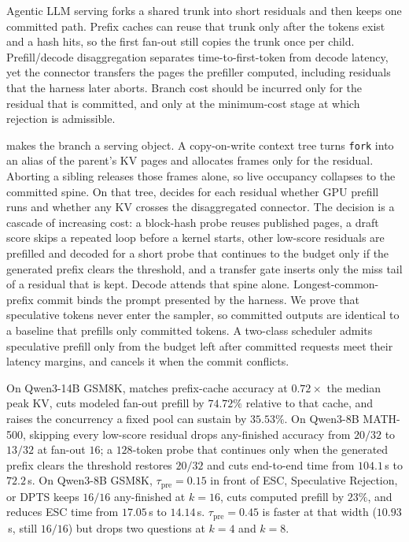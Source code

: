 Agentic LLM serving forks a shared trunk into short residuals and then keeps one committed path.
Prefix caches can reuse that trunk only after the tokens exist and a hash hits, so the first fan-out still copies the trunk once per child.
Prefill/decode disaggregation separates time-to-first-token from decode latency, yet the connector transfers the pages the prefiller computed, including residuals that the harness later aborts.
Branch cost should be incurred only for the residual that is committed, and only at the minimum-cost stage at which rejection is admissible.

\sys makes the branch a serving object.
A copy-on-write context tree turns \texttt{fork} into an alias of the parent's KV pages and allocates frames only for the residual.
Aborting a sibling releases those frames alone, so live occupancy collapses to the committed spine.
On that tree, \sys decides for each residual whether GPU prefill runs and whether any KV crosses the disaggregated connector.
The decision is a cascade of increasing cost: a block-hash probe reuses published pages, a draft score skips a repeated loop before a kernel starts, other low-score residuals are prefilled and decoded for a short probe that continues to the budget only if the generated prefix clears the threshold, and a transfer gate inserts only the miss tail of a residual that is kept.
Decode attends that spine alone.
Longest-common-prefix commit binds the prompt presented by the harness.
We prove that speculative tokens never enter the sampler, so committed outputs are identical to a baseline that prefills only committed tokens.
A two-class scheduler admits speculative prefill only from the budget left after committed requests meet their latency margins, and cancels it when the commit conflicts.

On Qwen3-14B GSM8K, \sys matches prefix-cache accuracy at $0.72\times$ the median peak KV, cuts modeled fan-out prefill by $74.72\%$ relative to that cache, and raises the concurrency a fixed pool can sustain by $35.53\%$.
On Qwen3-8B MATH-500, skipping every low-score residual drops any-finished accuracy from $20/32$ to $13/32$ at fan-out $16$; a $128$-token probe that continues only when the generated prefix clears the threshold restores $20/32$ and cuts end-to-end time from $104.1$\,s to $72.2$\,s.
On Qwen3-8B GSM8K, $\tau_{\mathrm{pre}}{=}0.15$ in front of ESC, Speculative Rejection, or DPTS keeps $16/16$ any-finished at $k{=}16$, cuts computed prefill by $23\%$, and reduces ESC time from $17.05$\,s to $14.14$\,s.
$\tau_{\mathrm{pre}}{=}0.45$ is faster at that width ($10.93$\,s, still $16/16$) but drops two questions at $k{=}4$ and $k{=}8$.
